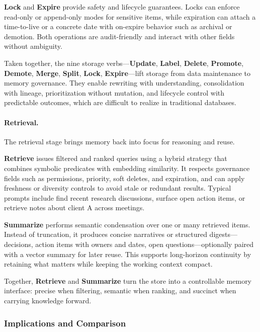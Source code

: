 \documentclass[conference]{IEEEtran}
\begin{document}
\textbf{Lock} and \textbf{Expire} provide safety and lifecycle guarantees. 
Locks can enforce read-only or append-only modes for sensitive items, while expiration can attach a time-to-live or a concrete date with on-expire behavior such as archival or demotion. 
Both operations are audit-friendly and interact with other fields without ambiguity. 

Taken together, the nine storage verbs—\textbf{Update}, \textbf{Label}, \textbf{Delete}, \textbf{Promote}, \textbf{Demote}, \textbf{Merge}, \textbf{Split}, \textbf{Lock}, \textbf{Expire}—lift storage from data maintenance to memory governance. 
They enable rewriting with understanding, consolidation with lineage, prioritization without mutation, and lifecycle control with predictable outcomes, which are difficult to realize in traditional databases. 

\paragraph{Retrieval.}
The retrieval stage brings memory back into focus for reasoning and reuse. 

\textbf{Retrieve} issues filtered and ranked queries using a hybrid strategy that combines symbolic predicates with embedding similarity. 
It respects governance fields such as permissions, priority, soft deletes, and expiration, and can apply freshness or diversity controls to avoid stale or redundant results. 
Typical prompts include find recent research discussions, surface open action items, or retrieve notes about client A across meetings. 

\textbf{Summarize} performs semantic condensation over one or many retrieved items. 
Instead of truncation, it produces concise narratives or structured digests—decisions, action items with owners and dates, open questions—optionally paired with a vector summary for later reuse. 
This supports long-horizon continuity by retaining what matters while keeping the working context compact. 

Together, \textbf{Retrieve} and \textbf{Summarize} turn the store into a controllable memory interface: precise when filtering, semantic when ranking, and succinct when carrying knowledge forward. 

\subsubsection{\textbf{Implications and Comparison}}
\label{subsubsec:ops-implications}
\end{document}
